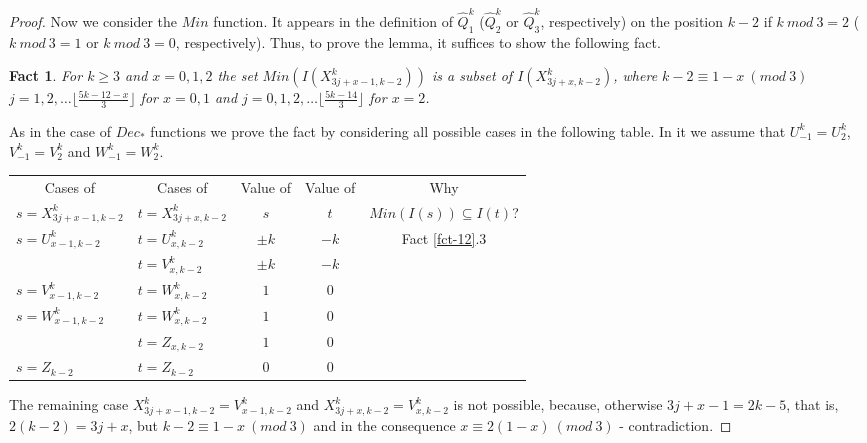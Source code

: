 \documentclass{llncs}
\newtheorem{fact}[theorem]{Fact}
\begin{document}
\begin{proof}
Now we consider the $Min$ function. It appears in the definition of 
$\hat{Q}^k_1$ ($\hat{Q}^k_2$ or $\hat{Q}^k_3$, respectively) on the position 
$k-2$ if $k~mod~3 = 2$ ($k~mod~3 = 1$ or $k~mod~3 = 0$, respectively). Thus, 
to prove the lemma, it suffices to show the following fact.
\begin{fact}
For $k\ge 3$ and $x=0,1,2$ the set $Min(I(X^k_{3j+x-1,k-2}))$ is a subset of
$I(X^k_{3j+x,k-2})$, where  $k-2 \equiv 1-x~(mod~3)$
$j=1,2,\ldots\lfloor\frac{5k-12-x}{3}\rfloor$ for $x=0,1$ and
$j=0,1,2,\ldots\lfloor\frac{5k-14}{3}\rfloor$ for $x=2$.
\end{fact}
As in the case of $Dec_*$ functions we prove the fact by considering all 
possible cases in the following table. In it we assume that $U^k_{-1}=U^k_2$,
$V^k_{-1}=V^k_2$ and $W^k_{-1}=W^k_2$.
\begin{center}
\begin{tabular}{||l|l||c|c||c||}
\hline\hline
      \multicolumn{1}{||c|}{Cases of} & \multicolumn{1}{|c||}{Cases of} & 
      Value of  & Value of  & Why  \\ 
      $s=X^k_{3j+x-1,k-2}$  & $t=X^k_{3j+x,k-2}$  & $s$  & $t$  & 
      $Min(I(s)) \subseteq I(t)$? \\ \hline
\hline\multirow{2}{*}{$s=U^k_{x-1,k-2}$} & $t=U^k_{x,k-2}$ & $\pm k$ & $-k$  &
      \multirow{6}{*}{Fact \ref{fct-12}.3}  \\ 
\cline{2-4} & $t=V^k_{x,k-2}$ & $\pm k$ &  $-k$ & \\ 
\cline{1-4} $s=V^k_{x-1,k-2}$ & $t=W^k_{x,k-2}$ & $1$ & $0$ & \\ 
\cline{1-4} \multirow{2}{*}{$s=W^k_{x-1,k-2}$} & $t=W^k_{x,k-2}$ & $1$ & $0$ 
& \\ 
\cline{2-4} & $t=Z_{x,k-2}$ & $1$ & $0$ & \\ 
\cline{1-4} $s=Z_{k-2}$ & $t=Z_{k-2}$ & 0 & $0$ & \\ 
\hline\hline 
\end{tabular}
\end{center}
The remaining case $X^k_{3j+x-1,k-2} = V^k_{x-1,k-2}$ and 
$X^k_{3j+x,k-2} = V^k_{x,k-2}$ is not possible, because, otherwise $3j+x-1 = 
2k-5$, that is, $2(k-2) = 3j+x$, but $k-2 \equiv 1-x~(mod~3)$ and in the 
consequence $x \equiv 2(1-x)~(mod~3)$ - contradiction.


\end{proof}
\end{document}
